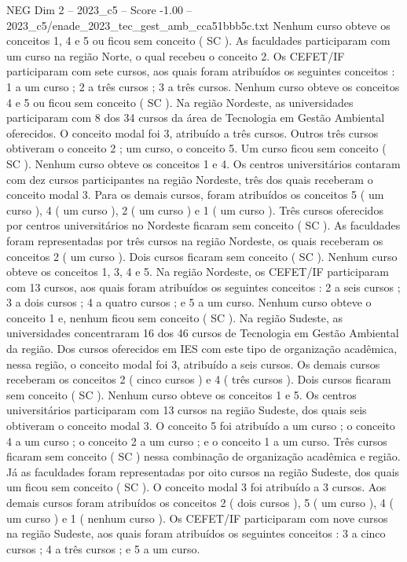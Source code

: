\begin{textsample}{NEG Dim 2 – 2023\_c5 – Score -1.00 – 2023\_c5/enade\_2023\_tec\_gest\_amb\_cca51bbb5c.txt}
Nenhum curso obteve os conceitos 1, 4 e 5 ou ficou sem conceito ( SC ).
As faculdades participaram com um curso na região Norte, o qual recebeu o conceito 2.
Os CEFET/IF participaram com sete cursos, aos quais foram atribuídos os seguintes conceitos : 1 a um curso ; 2 a três cursos ; 3 a três cursos.
Nenhum curso obteve os conceitos 4 e 5 ou ficou sem conceito ( SC ).
Na região Nordeste, as universidades participaram com 8 dos 34 cursos da área de Tecnologia em Gestão Ambiental oferecidos.
O conceito modal foi 3, atribuído a três cursos.
Outros três cursos obtiveram o conceito 2 ; um curso, o conceito 5.
Um curso ficou sem conceito ( SC ).
Nenhum curso obteve os conceitos 1 e 4.
Os centros universitários contaram com dez cursos participantes na região Nordeste, três dos quais receberam o conceito modal 3.
Para os demais cursos, foram atribuídos os conceitos 5 ( um curso ), 4 ( um curso ), 2 ( um curso ) e 1 ( um curso ).
Três cursos oferecidos por centros universitários no Nordeste ficaram sem conceito ( SC ).
As faculdades foram representadas por três cursos na região Nordeste, os quais receberam os conceitos 2 ( um curso ).
Dois cursos ficaram sem conceito ( SC ).
Nenhum curso obteve os conceitos 1, 3, 4 e 5.
Na região Nordeste, os CEFET/IF participaram com 13 cursos, aos quais foram atribuídos os seguintes conceitos : 2 a seis cursos ; 3 a dois cursos ; 4 a quatro cursos ; e 5 a um curso.
Nenhum curso obteve o conceito 1 e, nenhum ficou sem conceito ( SC ).
Na região Sudeste, as universidades concentraram 16 dos 46 cursos de Tecnologia em Gestão Ambiental da região.
Dos cursos oferecidos em IES com este tipo de organização acadêmica, nessa região, o conceito modal foi 3, atribuído a seis cursos.
Os demais cursos receberam os conceitos 2 ( cinco cursos ) e 4 ( três cursos ).
Dois cursos ficaram sem conceito ( SC ).
Nenhum curso obteve os conceitos 1 e 5.
Os centros universitários participaram com 13 cursos na região Sudeste, dos quais seis obtiveram o conceito modal 3.
O conceito 5 foi atribuído a um curso ; o conceito 4 a um curso ; o conceito 2 a um curso ; e o conceito 1 a um curso.
Três cursos ficaram sem conceito ( SC ) nessa combinação de organização acadêmica e região.
Já as faculdades foram representadas por oito cursos na região Sudeste, dos quais um ficou sem conceito ( SC ).
O conceito modal 3 foi atribuído a 3 cursos.
Aos demais cursos foram atribuídos os conceitos 2 ( dois cursos ), 5 ( um curso ), 4 ( um curso ) e 1 ( nenhum curso ).
Os CEFET/IF participaram com nove cursos na região Sudeste, aos quais foram atribuídos os seguintes conceitos : 3 a cinco cursos ; 4 a três cursos ; e 5 a um curso.

\end{textsample}
